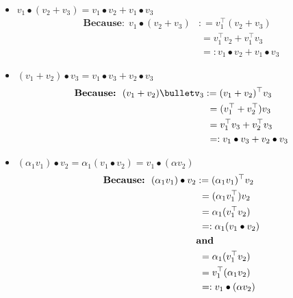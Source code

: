 \documentclass[letterpaper]{book}
\begin{document}
\begin{tcolorbox}[title={\bf \Large Properties of the Dot (or Inner) Product}]
\begin{itemize}
    \item $v_1 \bullet (v_2 + v_3) = v_1 \bullet v_2 + v_1 \bullet v_3$ 
    \begin{align*}
       \textbf{Because:}~~ v_1 \bullet (v_2 + v_3)& : = v_1^\top (v_2 + v_3)  \\
        &~=v_1^\top v_2 + v_1^\top v_3 \\
        &~=: v_1 \bullet v_2 + v_1 \bullet v_3
    \end{align*}
        \item $(v_1 +v_2) \bullet  v_3 = v_1 \bullet v_3+ v_2 \bullet v_3$ 
    \begin{align*}
       \textbf{Because:}~~ (v_1 + v_2)\bulletv_3 & : = (v_1 + v_2)^\top v_3  \\
        &~=(v_1^\top  + v_2^\top) v_3 \\
         &~=v_1^\top v_3   + v_2^\top v_3 \\
         &~ =:  v_1 \bullet v_3 + v_2 \bullet v_3
    \end{align*}
                \item $(\alpha_1 v_1) \bullet  v_2 = \alpha_1 (v_1 \bullet v_2) = v_1 \bullet (\alpha v_2)$ 
    \begin{align*}
       \textbf{Because:}~~ (\alpha_1 v_1)\bullet v_2 & : = (\alpha_1 v_1)^\top v_2  \\
        &~=(\alpha_1 v_1^\top ) v_2 \\
       &~=\alpha_1 (v_1^\top v_2 )  \\
         &~ =:  \alpha_1 (v_1 \bullet v_2) \\
         & \text{\bf and} \\
         &~=  \alpha_1 (v_1^\top v_2 )  \\
         &~=  v_1^\top( \alpha_1 v_2 )   \\
         &~ = : v_1 \bullet (\alpha v_2)
    \end{align*}
\end{itemize}

\end{tcolorbox}
\end{document}
